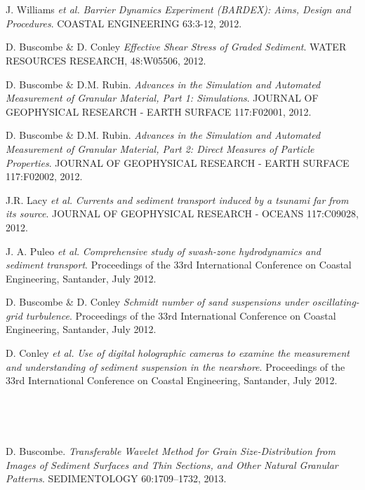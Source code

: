 \documentclass{article} %
\def\sf{\sffamily}
\def\sl{\slshape}
\newlength\sidebarwidth
\newcommand{\subtopic}[3][]
	 {\begin{minipage}{\textwidth}
	 \vspace*{.4\baselineskip}
         \nopagebreak\hspace{0in}%
         \nopagebreak\begin{minipage}[t]{\sidebarwidth - .2cm}
         \raggedleft {\sf\fontseries{sbc}\selectfont #2}
         {\\[-0.2\baselineskip] \textcolor{gray}{\footnotesize #1}}
	 \end{minipage}%
	 \hfill
	 \begin{minipage}[t]{\linewidth - \sidebarwidth}
	 #3%
	 \end{minipage}%
	 \vspace*{.2\baselineskip plus 1\baselineskip minus
	 .2\baselineskip}%
	 \end{minipage}}
\begin{document}
\subtopic{\hspace*{-3ex} 2012}{~
  \begin{itemize}[leftmargin=0ex, itemsep=0ex, parsep=.5ex, labelindent=-4ex]

    \publication
      J. Williams {\sl et al.}
      {\sl Barrier Dynamics Experiment (BARDEX): Aims, Design and Procedures}.
      COASTAL ENGINEERING 63:3-12, 2012.

    \publication
      D. Buscombe \& D. Conley
      {\sl Effective Shear Stress of Graded Sediment}.
      WATER RESOURCES RESEARCH, 48:W05506, 2012.

    \publication
      D. Buscombe \& D.M. Rubin.
      {\sl Advances in the Simulation and Automated Measurement of Granular Material, Part 1: Simulations}.
      JOURNAL OF GEOPHYSICAL RESEARCH - EARTH SURFACE 117:F02001, 2012.

    \publication
      D. Buscombe \& D.M. Rubin.
      {\sl Advances in the Simulation and Automated Measurement of Granular Material, Part 2: Direct Measures of Particle Properties}.
      JOURNAL OF GEOPHYSICAL RESEARCH - EARTH SURFACE 117:F02002, 2012.

    \publication
      J.R. Lacy {\sl et al.}
      {\sl Currents and sediment transport induced by a tsunami far from its source}.
      JOURNAL OF GEOPHYSICAL RESEARCH - OCEANS 117:C09028, 2012.

    \publication
      J. A. Puleo {\sl et al.}
      {\sl Comprehensive study of swash-zone hydrodynamics and sediment transport}.
      Proceedings of the 33rd International Conference on Coastal Engineering, Santander, July 2012.

    \publication
      D. Buscombe \& D. Conley
      {\sl Schmidt number of sand suspensions under oscillating-grid turbulence}.
      Proceedings of the 33rd International Conference on Coastal Engineering, Santander, July 2012.

    \publication
      D. Conley {\sl et al.}
      {\sl Use of digital holographic cameras to examine the measurement and understanding of sediment suspension in the nearshore}.
      Proceedings of the 33rd International Conference on Coastal Engineering, Santander, July 2012.

    \end{itemize}
}


\subtopic{\hspace*{-3ex} 2013}{~
  \begin{itemize}[leftmargin=0ex, itemsep=0ex, parsep=.5ex, labelindent=-4ex]

    \publication
      D. Buscombe.
      {\sl Transferable Wavelet Method for Grain Size-Distribution from Images of Sediment Surfaces and Thin Sections, and Other Natural Granular Patterns}.
      SEDIMENTOLOGY 60:1709--1732, 2013.

    \end{itemize}
}
\end{document}
